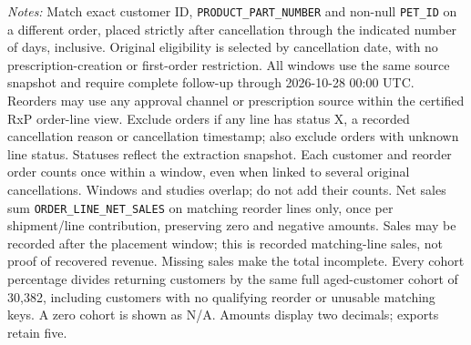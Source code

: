 \begin{table}[!htbp]
\begin{minipage}{\linewidth}
\footnotesize
\textit{Notes:} Match exact customer ID, \texttt{PRODUCT\_PART\_NUMBER} and non-null
\texttt{PET\_ID} on a different order, placed strictly after cancellation through
the indicated number of days, inclusive. Original eligibility is selected by
cancellation date, with no prescription-creation or first-order restriction.
All windows use the same source snapshot and require complete follow-up through
2026-10-28 00:00 UTC. Reorders may use any approval channel or prescription
source within the certified RxP order-line view. Exclude orders if any line has
status X, a recorded cancellation reason or cancellation timestamp; also exclude
orders with unknown line status. Statuses reflect the extraction snapshot.
Each customer and reorder order counts once within a window, even when linked
to several original cancellations. Windows and studies overlap; do not add their counts.
Net sales sum \texttt{ORDER\_LINE\_NET\_SALES} on matching reorder lines only,
once per shipment/line contribution, preserving zero and negative amounts.
Sales may be recorded after the placement window; this is recorded matching-line
sales, not proof of recovered revenue. Missing sales make the total incomplete.
Every cohort percentage divides returning customers by the same full aged-customer cohort of 30,382, including customers with no qualifying reorder or unusable matching keys. A zero cohort is shown as N/A. Amounts display two decimals; exports retain five.
\end{minipage}
\end{table}
